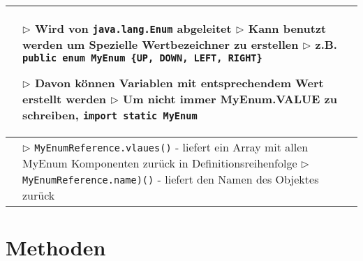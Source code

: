 	\begin{table}[H]
	\label{Enumerationen}
	\begin{tabular}{ | p{4cm} p{13.5cm} | }


	\hline
	\makecell[l]{Funktion} & 
	\makecell[l]
	{
	$\rhd$ Wird von \texttt{java.lang.Enum} abgeleitet \\
	$\rhd$ Kann benutzt werden um Spezielle Wertbezeichner zu 
	erstellen \\
	$\rhd$ z.B. \texttt{public enum MyEnum \{UP, DOWN, LEFT, RIGHT\}} 
	\\
	$\rhd$ Davon können Variablen mit entsprechendem Wert erstellt 
	werden \\
	$\rhd$ Um nicht immer MyEnum.VALUE zu schreiben, \texttt{import 
	static MyEnum}
	} 	\\ \hline


	\makecell[l]{Klassenmethoden} & 
	\makecell[l]
	{
	$\rhd$ \texttt{MyEnumReference.vlaues()} \\
	\hspace{0.4cm} - liefert ein Array mit allen MyEnum Komponenten zurück \\ 
	\hspace{0.66cm} in Definitionsreihenfolge \\
	$\rhd$ \texttt{MyEnumReference.name)()} \\
	\hspace{0.4cm} - liefert den Namen des Objektes zurück \\
	} 	\\ \hline

	
	\end{tabular}
	\end{table}
	
	

\section{Methoden}


